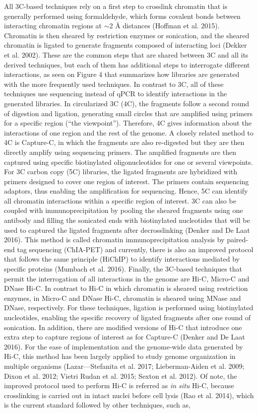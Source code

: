 All 3C-based techniques rely on a first step to crosslink chromatin that is generally performed using formaldehyde, which forms covalent bonds between interacting chromatin regions at $\sim$2 {\AA} distances (Hoffman et al. 2015). Chromatin is then sheared by restriction enzymes or sonication, and the sheared chromatin is ligated to generate fragments composed of interacting loci (Dekker et al. 2002). These are the common steps that are shared between 3C and all its derived techniques, but each of them has additional steps to interrogate different interactions, as seen on Figure 4 that summarizes how libraries are generated with the more frequently used techniques. In contrast to 3C, all of these techniques use sequencing instead of qPCR to identify interactions in the generated libraries. In circularized 3C (4C), the fragments follow a second round of digestion and ligation, generating small circles that are amplified using primers for a specific region (``the viewpoint''). Therefore, 4C gives information about the interactions of one region and the rest of the genome. A closely related method to 4C is Capture-C, in which the fragments are also re-digested but they are then directly amplify using sequencing primers. The amplified fragments are then captured using specific biotinylated oligonucleotides for one or several viewpoints. For 3C carbon copy (5C) libraries, the ligated fragments are hybridized with primers designed to cover one region of interest. The primers contain sequencing adaptors, thus enabling the amplification for sequencing. Hence, 5C can identify all chromatin interactions within a specific region of interest. 3C can also be coupled with immunoprecipitation by pooling the sheared fragments using one antibody and filling the sonicated ends with biotinylated nucleotides that will be used to captured the ligated fragments after decrosslinking (Denker and De Laat 2016). This method is called chromatin immunoprecipitation analysis by paired-end tag sequencing (ChIA-PET) and currently, there is also an improved protocol that follows the same principle (HiChIP) to identify interactions mediated by specific proteins (Mumbach et al. 2016). Finally, the 3C-based techniques that permit the interrogation of all interactions in the genome are Hi-C, Micro-C and DNase Hi-C. In contrast to Hi-C in which chromatin is sheared using restriction enzymes, in Micro-C and DNase Hi-C, chromatin is sheared using MNase and DNase, respectively. For these techniques, ligation is performed using biotinylated nucleotides, enabling the specific recovery of ligated fragments after one round of sonication. In addition, there are modified versions of Hi-C that introduce one extra step to capture regions of interest as for Capture-C (Denker and De Laat 2016). For the ease of implementation and the genome-wide data generated by Hi-C, this method has been largely applied to study genome organization in multiple organisms (Lazar---Stefanita et al. 2017; Lieberman-Aiden et al. 2009; Dixon et al. 2012; Vietri Rudan et al. 2015; Sexton et al. 2012). Of note, the improved protocol used to perform Hi-C is referred as \textit{in situ} Hi-C, because crosslinking is carried out in intact nuclei before cell lysis (Rao et al. 2014), which is the current standard followed by other techniques, such as, 